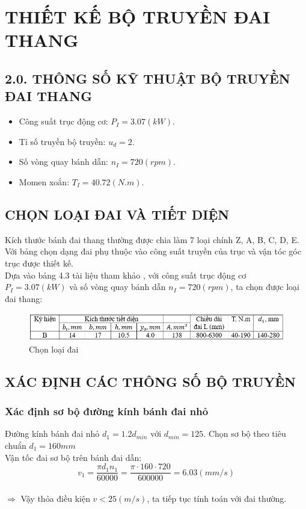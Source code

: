 \chapter{THIẾT KẾ BỘ TRUYỀN ĐAI THANG}
    \section*{2.0. THÔNG SỐ KỸ THUẬT BỘ TRUYỀN ĐAI THANG}
        \begin{itemize}
            \item Công suất trục động cơ: $P_{I} = 3.07(kW)$.
            \item Tỉ số truyền bộ truyền: $u_{d} = 2$.
            \item Số vòng quay bánh dẫn: $n_{I} = 720(rpm)$.
            \item Momen xoắn: $T_{I} = 40.72(N.m)$. 
        \end{itemize}
    \section{CHỌN LOẠI ĐAI VÀ TIẾT DIỆN}
        \hspace*{0.6cm}Kích thước bánh đai thang thường được chia làm 7 loại chính Z, A, B, C, D, E. Với bảng chọn dạng đai phụ thuộc vào công suất truyền của trục và vận tóc góc trục được thiết kế.\\
        \hspace*{0.6cm}Dựa vào bảng 4.3 tài liệu tham khảo \cite{gtctm}, với công suất trục động cơ $P_{I} = 3.07(kW)$ và số vòng quay bánh dẫn $n_{I} = 720(rpm)$, ta chọn được loại đai thang:\\  
        \begin{figure}[H]
            \centering
            \includegraphics[width=1\textwidth]{pictures/belt.png}
            \caption{Chọn loại đai}
        \end{figure}

    \section{XÁC ĐỊNH CÁC THÔNG SỐ BỘ TRUYỀN}
        \subsection{Xác định sơ bộ đường kính bánh đai nhỏ}
            \hspace*{0.6cm}Đường kính bánh đai nhỏ $d_1 = 1.2d_{min}$ với $d_{min} = 125$. Chọn sơ bộ theo tiêu chuẩn $d_1 = 160mm$\\
            \hspace*{0.6cm}Vận tốc đai sơ bộ trên bánh đai dẫn:
                $$v_1 = \frac{\pi d_1 n_1}{60000} = \frac{\pi \cdot 160 \cdot 720}{600000} = 6.03(mm/s)$$ \\
            $\Rightarrow$ Vậy thỏa điều kiện $v < 25 (m/s)$, ta tiếp tục tính toán với đai thường.
